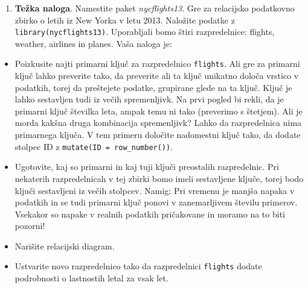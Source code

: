 \documentclass[
]{book}
\providecommand{\tightlist}{%
  \setlength{\itemsep}{0pt}\setlength{\parskip}{0pt}}
\begin{document}
\begin{enumerate}
\def\labelenumi{\arabic{enumi})}
\setcounter{enumi}{3}
\tightlist
\item
  \textbf{Težka naloga}. Namestite paket \emph{nycflights13}. Gre za relacijsko podatkovno zbirko o letih iz New Yorka v letu 2013. Naložite podatke z \texttt{library(nycflights13)}. Uporabljali bomo štiri razpredelnice: flights, weather, airlines in planes. Vaša naloga je:
\end{enumerate}

\begin{itemize}
\item
  Poizkusite najti primarni ključ za razpredelnico \texttt{flights}. Ali gre za primarni ključ lahko preverite tako, da preverite ali ta ključ unikatno določa vrstico v podatkih, torej da preštejete podatke, grupirane glede na ta ključ. Ključ je lahko sestavljen tudi iz večih spremenljivk. Na prvi pogled bi rekli, da je primarni ključ številka leta, ampak temu ni tako (preverimo s štetjem). Ali je morda kakšna druga kombinacija spremenljivk? Lahko da razpredelnica nima primarnega ključa. V tem primeru določite nadomestni ključ tako, da dodate stolpec ID z \texttt{mutate(ID\ =\ row\_number())}.
\item
  Ugotovite, kaj so primarni in kaj tuji ključi preostalih razpredelnic. Pri nekaterih razpredelnicah v tej zbirki bomo imeli sestavljene ključe, torej bodo ključi sestavljeni iz večih stolpcev. Namig: Pri vremenu je manjša napaka v podatkih in se tudi primarni ključ ponovi v zanemarljivem številu primerov. Vsekakor so napake v realnih podatkih pričakovane in moramo na to biti pozorni!
\item
  Narišite relacijski diagram.
\item
  Ustvarite novo razpredelnico tako da razpredelnici \texttt{flights} dodate podrobnosti o lastnostih letal za vsak let.


\end{itemize}
\end{document}
